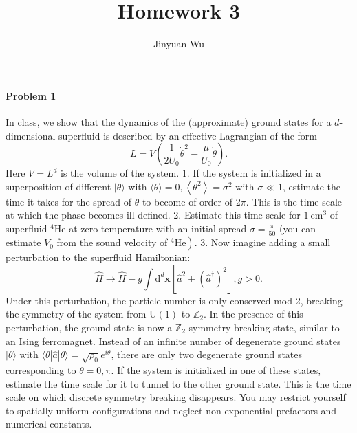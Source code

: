 \documentclass[hyperref, a4paper]{article}
\title{Homework 3}
\author{Jinyuan Wu}
\begin{document}
\maketitle

\paragraph{Problem 1} In class, we show that the dynamics of the (approximate) ground states for a $d$-dimensional superfluid is described by an effective Lagrangian of the form
$$
L=V\left(\frac{1}{2 U_0} \dot{\theta}^2-\frac{\mu}{U_0} \dot{\theta}\right) .
$$
Here $V=L^d$ is the volume of the system.
1. If the system is initialized in a superposition of different $|\theta\rangle$ with $\langle\theta\rangle=0,\left\langle\theta^2\right\rangle=\sigma^2$ with $\sigma \ll 1$, estimate the time it takes for the spread of $\theta$ to become of order of $2 \pi$. This is the time scale at which the phase becomes ill-defined.
2. Estimate this time scale for $1 \mathrm{~cm}^3$ of superfluid ${ }^4 \mathrm{He}$ at zero temperature with an initial spread $\sigma=\frac{\pi}{50}$ (you can estimate $V_0$ from the sound velocity of $\left.{ }^4 \mathrm{He}\right)$.
3. Now imagine adding a small perturbation to the superfluid Hamiltonian:
$$
\hat{H} \rightarrow \hat{H}-g \int \mathrm{d}^d \mathbf{x}\left[\hat{a}^2+\left(\hat{a}^{\dagger}\right)^2\right], g>0 .
$$
Under this perturbation, the particle number is only conserved mod 2, breaking the symmetry of the system from $\mathrm{U}(1)$ to $\mathbb{Z}_2$. In the presence of this perturbation, the ground state is now a $\mathbb{Z}_2$ symmetry-breaking state, similar to an Ising ferromagnet. Instead of an infinite number of degenerate ground states $|\theta\rangle$ with $\langle\theta|\hat{a}| \theta\rangle=\sqrt{\rho_0} e^{i \theta}$, there are only two degenerate ground states corresponding to $\theta=0, \pi$. If the system is initialized in one of these states, estimate the time scale for it to tunnel to the other ground state. This is the time scale on which discrete symmetry breaking disappears. You may restrict yourself to spatially uniform configurations and neglect non-exponential prefactors and numerical constants.
\end{document}
